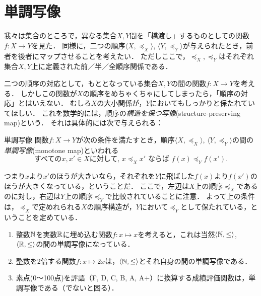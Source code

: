 \documentclass[dvipdfmx,11pt,a4paper]{jsarticle}
\begin{document}
\section{単調写像}
我々は集合のところで，異なる集合$X, Y$間を「橋渡し」するものとしての関数$f:X \to Y$を見た．
同様に，二つの順序$\langle X, \preceq_X \rangle$, $\langle Y, \preceq_Y \rangle$が与えられたとき，前者を後者にマップさせることを考えたい．
ただしここで，$\preceq_X, \preceq_Y$はそれぞれ集合$X,Y$上に定義された前／半／全順序関係である．

二つの順序の対応として，もととなっている集合$X, Y$の間の関数$f:X \to Y$を考える．
しかしこの関数が$X$の順序をめちゃくちゃにしてしまったら，「順序の対応」とはいえない．
むしろ$X$の大小関係が，$Y$においてもしっかりと保たれていてほしい．
これを数学的には，順序の\emph{構造を保つ写像}(structure-preserving map)という．
それは具体的には次で与えられる：
\begin{dfn}{単調写像}{}
関数$f:X \to Y$が次の条件を満たすとき，順序$\langle X, \preceq_X \rangle$, $\langle Y, \preceq_Y \rangle$の間の\emph{単調写像}(monotone map)といわれる
\[
 \text{すべての}x, x' \in X \text{に対して, }  x \preceq_X x' \text{ ならば } f(x) \preceq_Y f(x').
\]
\end{dfn}
つまり$x$より$x'$のほうが大きいなら，それぞれを$Y$に飛ばした$f(x)$より$f(x')$のほうが大きくなっている，ということだ．
ここで，左辺は$X$上の順序$\preceq_X$であるのに対し，右辺は$Y$上の順序$\preceq_Y$で比較されていることに注意．
よって上の条件は，$\preceq_X$で定めれられる$X$の順序構造が，$Y$において$\preceq_Y$として保たれている，ということを定めている．

\begin{rei}{}{}
 \begin{enumerate}
  \item 整数$\mathbb{N}$を実数$\mathbb{R}$に埋め込む関数$f:x \mapsto x$を考えると，これは当然$\langle \mathbb{N}, \leq \rangle$, $\langle \mathbb{R}, \leq \rangle$の間の単調写像になっている．
  \item 整数を2倍する関数$f:x \mapsto 2x$は，$\langle \mathbb{N}, \leq \rangle$とそれ自身の間の単調写像である．
  \item 素点(0〜100点)を評語（F, D, C, B, A, A+）に換算する成績評価関数は，単調写像である（でないと困る）．
 \end{enumerate}
\end{rei}
\end{document}
